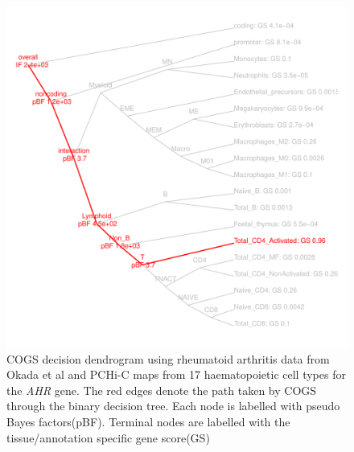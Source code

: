 \documentclass[a4paper,11pt]{report}
\begin{document}
\begin{figure}[ht]
\includegraphics[width=\textwidth]{AHR_dend.pdf}
\caption{COGS decision dendrogram using rheumatoid arthritis data from Okada et al and PCHi-C maps from 17 haematopoietic cell types for the \textit{AHR} gene. The red edges denote the path taken by COGS through the binary decision tree. Each node is labelled with pseudo Bayes factors(pBF). Terminal nodes are labelled with the tissue/annotation specific gene score(GS) }
\label{fig:AHR_dend}
\end{figure}
\end{document}
